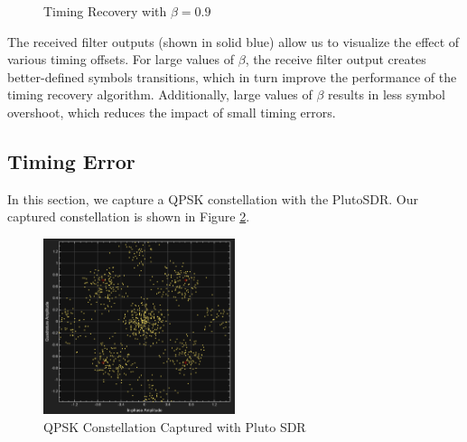 \documentclass{article}
\begin{document}
\begin{figure}[H]
	\centerline{}
	\caption{Timing Recovery with $\beta=0.9$}
	\label{fig::timing_recovery_beta_0_9}
\end{figure}

\noindent The received filter outputs (shown in solid blue) allow us to visualize the effect of various timing offsets. For large values of $\beta$, the receive filter output creates better-defined symbols transitions, which in turn improve the performance of the timing recovery algorithm. Additionally, large values of $\beta$ results in less symbol overshoot, which reduces the impact of small timing errors.

\subsection{Timing Error}

In this section, we capture a QPSK constellation with the PlutoSDR. Our captured constellation is shown in Figure \ref{fig::pluto_constellation_raw}.

\begin{figure}[H]
	\centerline{\includegraphics[width=0.5\textwidth]{pluto_constellation_raw.png}}
	\caption{QPSK Constellation Captured with Pluto SDR}
	\label{fig::pluto_constellation_raw}
\end{figure}
\end{document}
